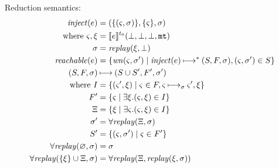 \documentclass{llncs}
\begin{document}
Reduction semantics:
\begin{align*}
\mathit{inject}(e) &= (\{(\varsigma, \sigma)\}, \{\varsigma\}, \sigma) \\
 \text{ where } \varsigma, \xi &= \llbracket e\rrbracket^{{t_0}}(\bot,\bot,\bot,{\tt mt}) \\
                \sigma &= \mathit{replay}(\xi,\bot) \\
\mathit{reachable}(e) &= \{\mathit{wn}(\varsigma,\sigma') \mid
                             \mathit{inject}(e) \mathbin{\longmapsto}^* (S,F,\sigma),
                             (\varsigma, \sigma') \in S\} \\
(S,F,\sigma) &\mathbin{\longmapsto} (S \cup S', F', \sigma') \\
 \text{ where } I &=
   \{ (\varsigma', \xi) \mid \varsigma \in F, \varsigma \mathbin{\longmapsto}_\sigma \varsigma', \xi\} \\
   F' &= \{\varsigma \mid \exists \xi. (\varsigma, \xi) \in I\} \\
   \Xi &= \{\xi \mid \exists \varsigma. (\varsigma, \xi) \in I\} \\
   \sigma' &= \forall\mathit{replay}(\Xi,\sigma) \\
   S' &= \{(\varsigma, \sigma') \mid \varsigma \in F'\} \\
   \forall\mathit{replay}(\varnothing,\sigma) &= \sigma \\
   \forall\mathit{replay}(\{\xi\} \cup \Xi, \sigma) &= \forall\mathit{replay}(\Xi, \mathit{replay}(\xi, \sigma))
\end{align*}

\end{document}
